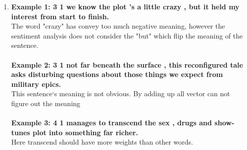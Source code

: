 \documentclass[10pt]{article}
\begin{document}
\begin{enumerate}[label=(\alph*)]
\item
\textbf{Example 1: 3	1	we know the plot 's a little crazy , but it held my interest from start to finish.}\\
The word "crazy" has convey too much negative meaning,
however the sentiment analysis does not consider the "but" which flip the meaning of the sentence.\\
\\\textbf{Example 2: 3	1	not far beneath the surface , this reconfigured tale asks disturbing questions about those things we expect from military epics.}\\
This sentence`s meaning is not obvious. By adding up all vector can not figure out the meaning\\
\\\textbf{Example 3: 4 1	manages to transcend the sex , drugs and show-tunes plot into something far richer.}\\
Here transcend should have more weights than other words.
\end{enumerate}
\end{document}
